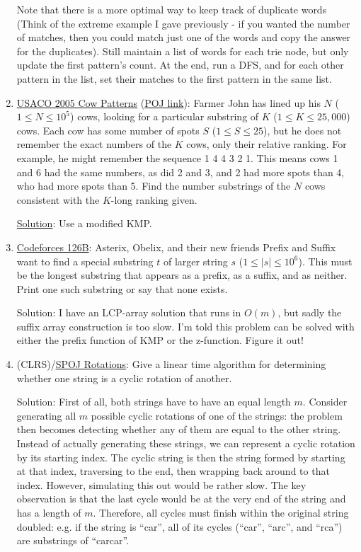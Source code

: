 \documentclass[11pt, oneside]{article}
\begin{document}
\begin{enumerate}
  Note that there is a more optimal way to keep track of duplicate words
  (Think of the extreme example I gave previously - if you wanted the number of matches,
  then you could match just one of the words and copy the answer for the duplicates).
  Still maintain a list of words for each trie node, but only update the first pattern's count.
  At the end, run a DFS, and for each other pattern in the list, set their matches to the first pattern in the same list.

  \item \href{https://contest.usaco.org/DEC05.htm}{USACO 2005 Cow Patterns} (\href{http://poj.org/problem?id=3167}{POJ link}): Farmer John has lined up his \( N \) (\( 1 \leq N \leq 10^5 \)) cows,
  looking for a particular substring of \( K \) (\( 1 \leq K \leq 25,000 \)) cows.
  Each cow has some number of spots \( S \) (\( 1 \leq S \leq 25 \)), but he does
  not remember the exact numbers of the \( K \) cows, only their relative ranking. For example, he might
  remember the sequence 1 4 4 3 2 1. This means cows 1 and 6 had the same numbers, as did 2 and 3,
  and 2 had more spots than 4, who had more spots than 5.
  Find the number substrings of the \( N \) cows consistent with the \( K \)-long ranking given.

  \href{https://contest.usaco.org/DEC05anal/cpattern.htm}{Solution}: Use a modified KMP.

  \item \href{https://codeforces.com/problemset/problem/126/B}{Codeforces 126B}: Asterix, Obelix, and their new friends Prefix and Suffix
  want to find a special substring \( t \) of larger string \( s \) (\(1 \leq |s| \leq 10^6 \)).
  This must be the longest substring that appears as a prefix, as a suffix, and as neither.
  Print one such substring or say that none exists.

  Solution: I have an LCP-array solution that runs in \( O(m) \), but sadly the suffix array construction is too slow. I'm told this problem can be solved with either the prefix function of KMP or the z-function. Figure it out!

  \item (CLRS)/\href{https://www.spoj.com/problems/EC_WORLD}{SPOJ Rotations}: Give a linear time algorithm for determining whether one string is a cyclic rotation of another.

  Solution: First of all, both strings have to have an equal length \( m \).
  Consider generating all \( m \) possible cyclic rotations of one of the strings: the problem
  then becomes detecting whether any of them are equal to the other string. Instead of
  actually generating these strings, we can represent a cyclic rotation by its starting index.
  The cyclic string is then the string formed by starting at that index, traversing to the end,
  then wrapping back around to that index. However, simulating this out would be rather slow.
  The key observation is that the last cycle would be at the very end of the string
  and has a length of \( m \). Therefore, all cycles must finish within the original string doubled:
  e.g. if the string is ``car'', all of its cycles (``car'', ``arc'', and ``rca'') are substrings of ``carcar''.


\end{enumerate}
\end{document}
